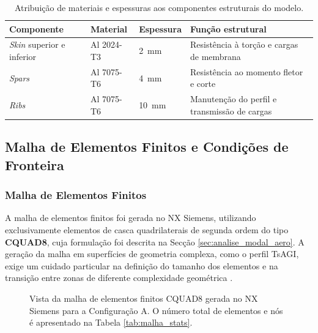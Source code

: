 \documentclass[a4paper,fleqn,noprintline]{cas-dc}
\begin{document}
\begin{table}[h!]
\centering
\caption{Atribuição de materiais e espessuras aos componentes 
estruturais do modelo.}
\label{tab:material_componentes}
\renewcommand{\arraystretch}{1.4}
\begin{tabularx}{\textwidth}{p{3.5cm} p{3cm} p{2cm} X}
\toprule
\textbf{Componente} & \textbf{Material} & 
\textbf{Espessura} & \textbf{Função estrutural} \\
\midrule
\textit{Skin} superior e inferior & Al 2024-T3 & 
    \SI{2}{\milli\meter} & 
    Resistência à torção e cargas de membrana \\
\textit{Spars} & Al 7075-T6 & 
    \SI{4}{\milli\meter}\footnotemark & 
    Resistência ao momento fletor e corte \\
\textit{Ribs} & Al 7075-T6 & 
    \SI{10}{\milli\meter} & 
    Manutenção do perfil e transmissão de cargas \\
\bottomrule
\end{tabularx}
\end{table}

\subsection{Malha de Elementos Finitos e Condições de Fronteira}

\subsubsection{Malha de Elementos Finitos}

A malha de elementos finitos foi gerada no NX Siemens, utilizando exclusivamente elementos de casca quadrilaterais de segunda ordem do tipo \textbf{CQUAD8}, cuja formulação foi descrita na Secção \ref{sec:analise_modal_aero}. A geração da malha em superfícies de geometria complexa, como o perfil TsAGI, exige um cuidado particular na definição do tamanho dos elementos e na transição entre zonas de diferente complexidade geométrica \cite{Bathe2014}.

\begin{figure}[h!]
    \centering
    \caption{Vista da malha de elementos finitos CQUAD8 gerada 
    no NX Siemens para a Configuração A. O número total de 
    elementos e nós é apresentado na Tabela 
    \ref{tab:malha_stats}.}
    \label{fig:malha_nx}
\end{figure}
\end{document}
